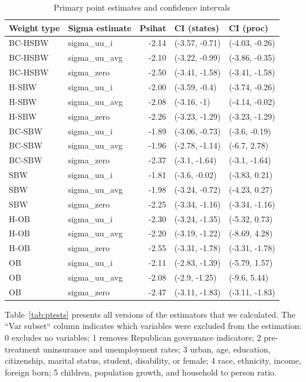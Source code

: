 \documentclass[12pt]{article}
\begin{document}
\begin{table}[ht]
\begin{tabular}{llrll}
  \toprule
Weight type & Sigma estimate & Psihat & CI (states) & CI (proc) \\ 
  \midrule
BC-HSBW & sigma\_uu\_i & -2.14 & (-3.57, -0.71) & (-4.03, -0.26) \\ 
  BC-HSBW & sigma\_uu\_avg & -2.10 & (-3.22, -0.99) & (-3.86, -0.35) \\ 
  BC-HSBW & sigma\_zero & -2.50 & (-3.41, -1.58) & (-3.41, -1.58) \\ 
  H-SBW & sigma\_uu\_i & -2.00 & (-3.59, -0.4) & (-3.74, -0.26) \\ 
  H-SBW & sigma\_uu\_avg & -2.08 & (-3.16, -1) & (-4.14, -0.02) \\ 
  H-SBW & sigma\_zero & -2.26 & (-3.23, -1.29) & (-3.23, -1.29) \\ 
  BC-SBW & sigma\_uu\_i & -1.89 & (-3.06, -0.73) & (-3.6, -0.19) \\ 
  BC-SBW & sigma\_uu\_avg & -1.96 & (-2.78, -1.14) & (-6.7, 2.78) \\ 
  BC-SBW & sigma\_zero & -2.37 & (-3.1, -1.64) & (-3.1, -1.64) \\ 
  SBW & sigma\_uu\_i & -1.81 & (-3.6, -0.02) & (-3.83, 0.21) \\ 
  SBW & sigma\_uu\_avg & -1.98 & (-3.24, -0.72) & (-4.23, 0.27) \\ 
  SBW & sigma\_zero & -2.25 & (-3.34, -1.16) & (-3.34, -1.16) \\ 
  H-OB & sigma\_uu\_i & -2.30 & (-3.24, -1.35) & (-5.32, 0.73) \\ 
  H-OB & sigma\_uu\_avg & -2.20 & (-3.19, -1.22) & (-8.69, 4.28) \\ 
  H-OB & sigma\_zero & -2.55 & (-3.31, -1.78) & (-3.31, -1.78) \\ 
  OB & sigma\_uu\_i & -2.11 & (-2.83, -1.39) & (-5.79, 1.57) \\ 
  OB & sigma\_uu\_avg & -2.08 & (-2.9, -1.25) & (-9.6, 5.44) \\ 
  OB & sigma\_zero & -2.47 & (-3.11, -1.83) & (-3.11, -1.83) \\ 
   \bottomrule
\end{tabular}
\caption{Primary point estimates and confidence intervals}
\label{tab:confintmain}
\end{table}

Table~\ref{tab:ptests} presents all versions of the estimators that we calculated. The ``Var subset`` column indicates which variables were excluded from the estimation: 0 excludes no variables; 1 removes Republican governance indicators; 2 pre-treatment uninsurance and unemployment rates; 3 urban, age, education, citizenship, marital status, student, disability, or female; 4 race, ethnicity, income, foreign born; 5 children, population growth, and household to person ratio.
\end{document}
